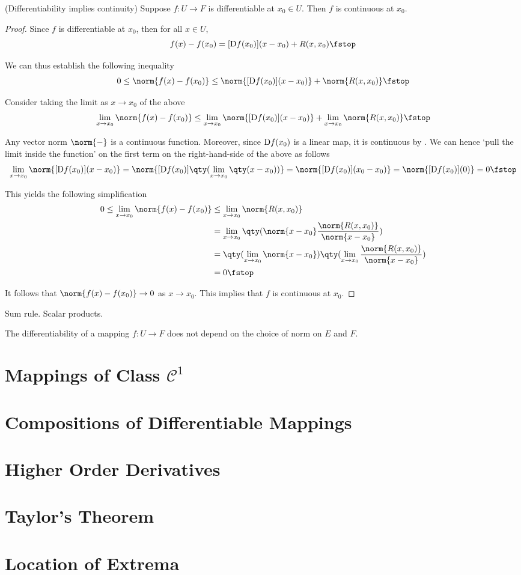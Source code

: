 \begin{theorem}
  (Differentiability implies continuity) Suppose \( f:U\to F \) is differentiable at \( x_0\in U \). Then \( f \) is continuous at \( x_0 \).
\end{theorem}
\begin{proof}
  Since \( f \) is differentiable at \( x_0 \), then for all \( x\in U \),
  \[ f(x)-f(x_0)=[\D f(x_0)](x-x_0)+R(x,x_0)\fstop \]

  We can thus establish the following inequality
  \[ 0\leq\norm{f(x)-f(x_0)}\leq\norm{[\D f(x_0)](x-x_0)}+\norm{R(x,x_0)}\fstop \]

  Consider taking the limit as \( x\to x_0 \) of the above
  \begin{equation*}
    \lim_{x\to x_0}\norm{f(x)-f(x_0)}\leq \lim_{x\to x_0}\norm{[\D f(x_0)](x-x_0)}+\lim_{x\to x_0}\norm{R(x,x_0)}\fstop
  \end{equation*}

  Any vector norm \( \norm{-} \) is a continuous function. Moreover, since \( \text{D} f(x_0) \) is a linear map, it is continuous by . We can hence `pull the limit inside the function' on the first term on the right-hand-side of the above as follows
  \[ \lim_{x\to x_0}\norm{[\D f(x_0)](x-x_0)}=\norm{[\D f(x_0)]\qty(\lim_{x\to x_0}\qty(x-x_0))}=\norm{[\D f(x_0)](x_0-x_0)}=\norm{[\D f(x_0)](0)}=0\fstop \]

  This yields the following simplification
  \begin{align*}
    0\leq \lim_{x\to x_0}\norm{f(x)-f(x_0)}&\leq \lim_{x\to x_0}\norm{R(x,x_0)}\\
    &= \lim_{x\to x_0}\qty(\norm{x-x_0}\frac{\norm{R(x,x_0)}}{\norm{x-x_0}})\\
    &= \qty(\lim_{x\to x_0}\norm{x-x_0})\qty(\lim_{x\to x_0}\frac{\norm{R(x,x_0)}}{\norm{x-x_0}})\\
    &= 0\fstop
  \end{align*}

  It follows that \( \norm{f(x)-f(x_0)}\to 0 \) as \( x\to x_0 \). This implies that \( f \) is continuous at \( x_0\).
\end{proof}

Sum rule. Scalar products.

\begin{theorem}
  The differentiability of a mapping \( f:U\to F \) does not depend on the choice of norm on \( E \) and \( F \).
\end{theorem}

\section{Mappings of Class \( \mathcal{C}^1\)}
\section{Compositions of Differentiable Mappings}
\section{Higher Order Derivatives}
\section{Taylor's Theorem}
\section{Location of Extrema}

